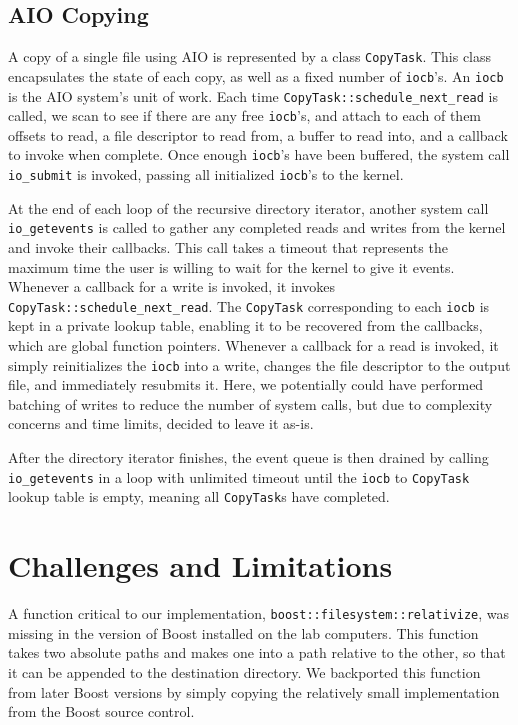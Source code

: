 \documentclass[11pt]{article}
\begin{document}
\subsection{AIO Copying}
A copy of a single file using AIO is represented by a class \texttt{CopyTask}. This class encapsulates the state of each copy, as well as a fixed number of  \texttt{iocb}'s. An \texttt{iocb} is the AIO system's unit of work. Each time \texttt{CopyTask::schedule\_next\_read} is called, we scan to see if there are any free \texttt{iocb}'s, and attach to each of them offsets to read, a file descriptor to read from, a buffer to read into, and a callback to invoke when complete. Once enough \texttt{iocb}'s have been buffered, the system call \texttt{io\_submit} is invoked, passing all initialized \texttt{iocb}'s to the kernel. 

At the end of each loop of the recursive directory iterator, another system call \texttt{io\_getevents} is called to gather any completed reads and writes from the kernel and invoke their callbacks. This call takes a timeout that represents the maximum time the user is willing to wait for the kernel to give it events. Whenever a callback for a write is invoked, it invokes \texttt{CopyTask::schedule\_next\_read}. The \texttt{CopyTask} corresponding to each \texttt{iocb} is kept in a private lookup table, enabling it to be recovered from the callbacks, which are global function pointers. Whenever a callback for a read is invoked, it simply reinitializes the \texttt{iocb} into a write, changes the file descriptor to the output file, and immediately resubmits it. Here, we potentially could have performed batching of writes to reduce the number of system calls, but due to complexity concerns and time limits, decided to leave it as-is.

After the directory iterator finishes, the event queue is then drained by calling \texttt{io\_getevents} in a loop with unlimited timeout until the \texttt{iocb} to \texttt{CopyTask} lookup table is empty, meaning all \texttt{CopyTask}s have completed.

\section{Challenges and Limitations}
A function critical to our implementation,
\texttt{boost::filesystem::relativize}, was missing in the version of Boost
installed on the lab computers. This function takes two absolute paths and makes
one into a path relative to the other, so that it can be appended to the
destination directory. We backported this function from later Boost versions by
simply copying the relatively small implementation from the Boost source
control.
\end{document}
